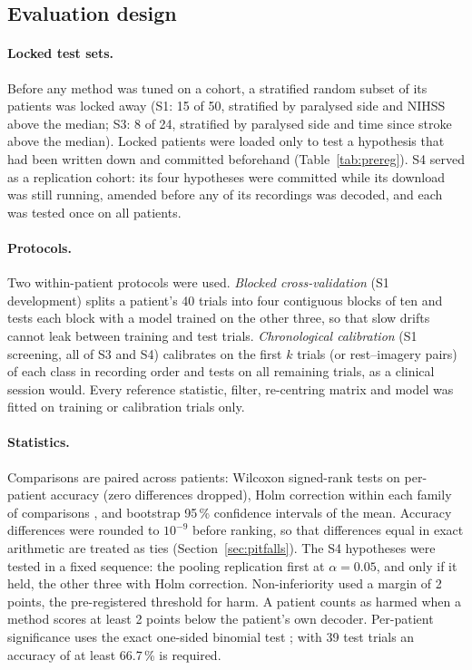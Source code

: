 \documentclass[11pt]{article}
\newcommand{\pct}{\,\%}
\begin{document}
\subsection{Evaluation design}
\label{sec:design}

\paragraph{Locked test sets.} Before any method was tuned on a cohort, a stratified random subset of its patients was locked away (S1: 15 of 50, stratified by paralysed side and NIHSS above the median; S3: 8 of 24, stratified by paralysed side and time since stroke above the median). Locked patients were loaded only to test a hypothesis that had been written down and committed beforehand (Table~\ref{tab:prereg}). S4 served as a replication cohort: its four hypotheses were committed while its download was still running, amended before any of its recordings was decoded, and each was tested once on all patients.

\paragraph{Protocols.} Two within-patient protocols were used. \emph{Blocked cross-validation} (S1 development) splits a patient's 40 trials into four contiguous blocks of ten and tests each block with a model trained on the other three, so that slow drifts cannot leak between training and test trials. \emph{Chronological calibration} (S1 screening, all of S3 and S4) calibrates on the first $k$ trials (or rest--imagery pairs) of each class in recording order and tests on all remaining trials, as a clinical session would. Every reference statistic, filter, re-centring matrix and model was fitted on training or calibration trials only.

\paragraph{Statistics.} Comparisons are paired across patients: Wilcoxon signed-rank tests on per-patient accuracy (zero differences dropped), Holm correction within each family of comparisons \citep{holm1979}, and bootstrap 95\pct{} confidence intervals of the mean. Accuracy differences were rounded to $10^{-9}$ before ranking, so that differences equal in exact arithmetic are treated as ties (Section~\ref{sec:pitfalls}). The S4 hypotheses were tested in a fixed sequence: the pooling replication first at $\alpha = 0.05$, and only if it held, the other three with Holm correction. Non-inferiority used a margin of 2 points, the pre-registered threshold for harm. A patient counts as harmed when a method scores at least 2 points below the patient's own decoder. Per-patient significance uses the exact one-sided binomial test \citep{combrisson2015}; with 39 test trials an accuracy of at least 66.7\pct{} is required.
\end{document}
